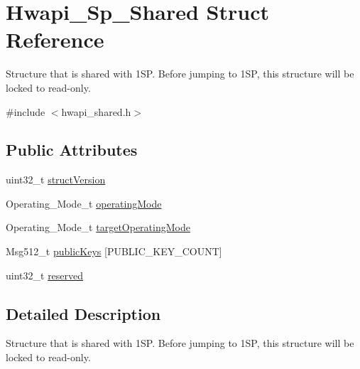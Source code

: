 \hypertarget{structHwapi__1Sp__Shared}{\section{Hwapi\-\_\-Sp\-\_\-\-Shared Struct Reference}
\label{structHwapi__1Sp__Shared}
}


Structure that is shared with 1\-S\-P. Before jumping to 1\-S\-P, this structure will be locked to read-\/only.  




{\ttfamily \#include $<$hwapi\-\_\-shared.\-h$>$}

\subsection*{Public Attributes}
\begin{DoxyCompactItemize}
\item 
uint32\-\_\-t \hyperlink{structHwapi__1Sp__Shared_a47f4dd2e05f5b32d6c5742d55a164d22}{struct\-Version}
\item 
Operating\-\_\-\-Mode\-\_\-t \hyperlink{structHwapi__1Sp__Shared_ad354953dd9bfa3140e0999f458f0dc50}{operating\-Mode}
\item 
Operating\-\_\-\-Mode\-\_\-t \hyperlink{structHwapi__1Sp__Shared_afb76ddf0c514be3d6528ff5b24dbbe33}{target\-Operating\-Mode}
\item 
Msg512\-\_\-t \hyperlink{structHwapi__1Sp__Shared_a592636290a907609eb10428f76ebeb48}{public\-Keys} \mbox{[}P\-U\-B\-L\-I\-C\-\_\-\-K\-E\-Y\-\_\-\-C\-O\-U\-N\-T\mbox{]}
\item 
uint32\-\_\-t \hyperlink{structHwapi__1Sp__Shared_ad72f4ce5b2ca22b7da364504466e1dbe}{reserved}
\end{DoxyCompactItemize}


\subsection{Detailed Description}
Structure that is shared with 1\-S\-P. Before jumping to 1\-S\-P, this structure will be locked to read-\/only. 

